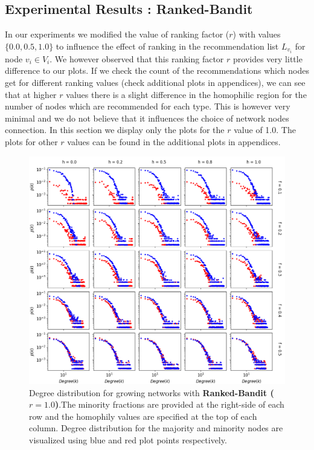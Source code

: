 \subsection{Experimental Results : Ranked-Bandit}

In our experiments we modified the value of ranking factor ($r$) with values $\{0.0, 0.5, 1.0\}$ to influence the effect of ranking in the recommendation list $L_{v_{i}}$ for node $v_{i} \in V_{i}$. We however observed that this ranking factor $r$ provides very little difference to our plots. If we check the count of the recommendations which nodes get for different ranking values (check additional plots in appendices), we can see that at higher $r$ values there is a slight difference in the homophilic region for the number of nodes which are recommended for each type. This is however very minimal and we do not believe that it influences the choice of network nodes connection. In this section we display only the plots for the $r$ value of 1.0. The plots for other $r$ values can be found in the additional plots in appendices. 

\begin{figure}[h!]
	\centering
	\includegraphics[width=1.0\textwidth]{images/dd_growth_rb10.png}
	\caption{Degree distribution for growing networks with \textbf{Ranked-Bandit ($r = 1.0$)}.The minority fractions are provided at the right-side of each row and the homophily values are specified at the top of each column. Degree distribution for the majority and minority nodes are visualized using blue and red plot points respectively.}
	\label{dd_growth_rb10_fig}
\end{figure}

